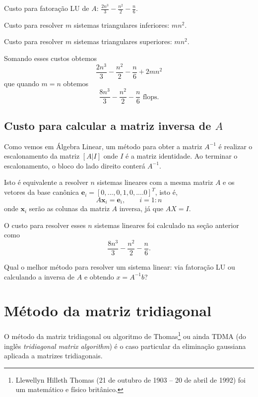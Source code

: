 Custo para fatoração LU de $A$: $\frac{2n^3}{3}-\frac{n^2}{2}-\frac{n}{6}$.

Custo para resolver $m$ sistemas triangulares inferiores: $m n^2 $.

Custo para resolver $m$ sistemas triangulares superiores: $m n^2 $.

Somando esses custos obtemos
\begin{equation} \frac{2n^3}{3}-\frac{n^2}{2}-\frac{n}{6}+2m n^2  \end{equation}
que quando $m=n$ obtemos
\begin{equation} \frac{8n^3}{3}-\frac{n^2}{2}-\frac{n}{6} \text{~flops}. \end{equation}

\subsection{Custo para calcular a matriz inversa de $A$}
Como vemos em Álgebra Linear, um método para obter a matriz $A^{-1}$ é realizar o escalonamento da matriz $[A|I]$ onde $I$ é a matriz identidade. Ao terminar o escalonamento, o bloco do lado direito conterá $A^{-1}$.

Isto é equivalente a resolver $n$ sistemas lineares com a mesma matriz $A$ e os vetores da base canônica $\pmb e_i = [0,...,0,1,0,....0]^T$, isto é,
\begin{equation}  A \pmb x_i = \pmb e_i, \quad\quad i=1:n  \end{equation}
onde $\pmb x_i$ serão as colunas da matriz $A$ inversa, já que $A X=I$.

O custo para resolver esses $n$ sistemas lineares foi calculado na seção anterior como
\begin{equation} \frac{8n^3}{3}-\frac{n^2}{2}-\frac{n}{6}. \end{equation}

\begin{ex}
 Qual o melhor método para resolver um sistema linear: via fatoração LU ou calculando a inversa de $A$ e obtendo $x=A^{-1}b$?
\end{ex}


\section{Método da matriz tridiagonal}
O método da matriz tridiagonal ou algoritmo de Thomas\footnote{Llewellyn Hilleth Thomas (21 de outubro de 1903 – 20 de abril de 1992) foi um matemático e físico britânico.} ou ainda TDMA (do inglês {\it tridiagonal matrix algorithm}) é o caso particular da eliminação gaussiana aplicada a matrizes tridiagonais.

